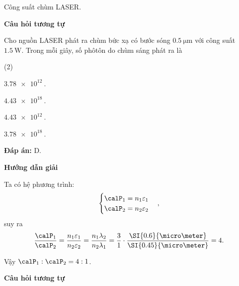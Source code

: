 \begin{dang}{Công suất chùm LASER.}
{		\begin{center}
			\textbf{Câu hỏi tương tự}
		\end{center}
		
		Cho nguồn LASER phát ra chùm bức xạ có bước sóng $\SI{0.5}{\micro \meter}$ với công suất $\SI{1.5}{\watt}$. Trong mỗi giây, số phôtôn do chùm sáng phát ra là
		\begin{mcq}(2)
			\item $\SI{3,78 e12}{}$.
			\item $\SI{4,43 e18}{}$.
			\item $\SI{4,43 e12}{}$.
			\item $\SI{3,78 e18}{}$.
		\end{mcq}
		
		\textbf{Đáp án:} D.
	}
	{\begin{center}
			\textbf{Hướng dẫn giải}
		\end{center}
		
		Ta có hệ phương trình:
		\begin{equation*}\begin{cases}
				\calP_1 = n_1 \varepsilon_1 \\
				\calP_2 = n_2 \varepsilon_2
			\end{cases},\end{equation*}
		suy ra
		\begin{equation*}
			\dfrac{\calP_1}{\calP_2} = \dfrac{n_1 \varepsilon_1}{n_2 \varepsilon_2} = \dfrac{n_1 \lambda_2}{n_2 \lambda_1} = \dfrac{3}{1} \cdot \dfrac{\SI{0.6}{\micro \meter}}{\SI{0.45}{\micro \meter}} = 4.
		\end{equation*}
		
		Vậy $\calP_1:\calP_2 = 4:1$.
		
		\begin{center}
			\textbf{Câu hỏi tương tự}
		\end{center}
		
}
\end{dang}
